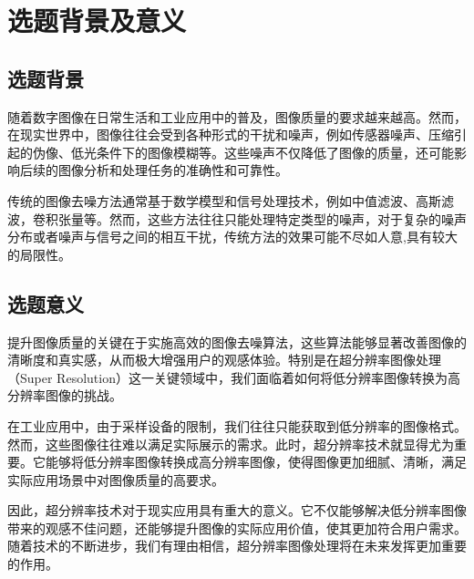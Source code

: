 \section{选题背景及意义}

\subsection*{选题背景}
随着数字图像在日常生活和工业应用中的普及，图像质量的要求越来越高。然而，在现实世界中，图像往往会受到各种形式的干扰和噪声，例如传感器噪声、压缩引起的伪像、低光条件下的图像模糊等。这些噪声不仅降低了图像的质量，还可能影响后续的图像分析和处理任务的准确性和可靠性。    


传统的图像去噪方法通常基于数学模型和信号处理技术，例如中值滤波、高斯滤波，卷积张量等。然而，这些方法往往只能处理特定类型的噪声，对于复杂的噪声分布或者噪声与信号之间的相互干扰，传统方法的效果可能不尽如人意,具有较大的局限性。
\subsection*{选题意义}
提升图像质量的关键在于实施高效的图像去噪算法，这些算法能够显著改善图像的清晰度和真实感，从而极大增强用户的观感体验。特别是在超分辨率图像处理（Super Resolution）这一关键领域中，我们面临着如何将低分辨率图像转换为高分辨率图像的挑战。     

在工业应用中，由于采样设备的限制，我们往往只能获取到低分辨率的图像格式。然而，这些图像往往难以满足实际展示的需求。此时，超分辨率技术就显得尤为重要。它能够将低分辨率图像转换成高分辨率图像，使得图像更加细腻、清晰，满足实际应用场景中对图像质量的高要求。    

因此，超分辨率技术对于现实应用具有重大的意义。它不仅能够解决低分辨率图像带来的观感不佳问题，还能够提升图像的实际应用价值，使其更加符合用户需求。随着技术的不断进步，我们有理由相信，超分辨率图像处理将在未来发挥更加重要的作用。


\par 

